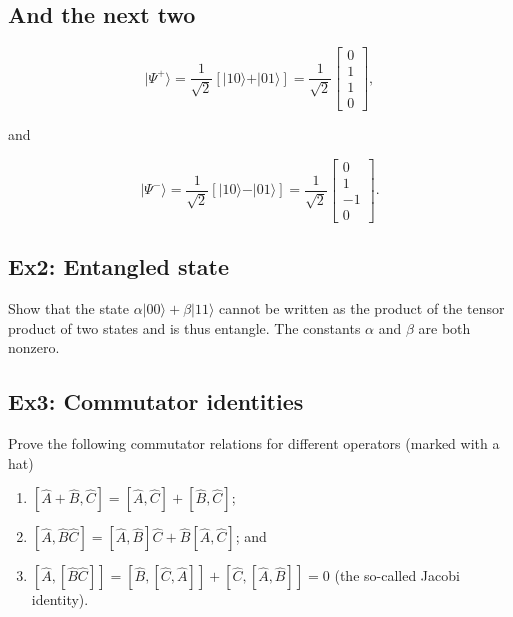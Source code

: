 \subsection{And the next two}
\[
\vert \Psi^+\rangle = \frac{1}{\sqrt{2}}\left[\vert 10\rangle +\vert 01\rangle\right]=\frac{1}{\sqrt{2}}\begin{bmatrix} 0 \\ 1 \\ 1 \\ 0\end{bmatrix},
\]

and

\[
\vert \Psi^-\rangle = \frac{1}{\sqrt{2}}\left[\vert 10\rangle -\vert 01\rangle\right]=\frac{1}{\sqrt{2}}\begin{bmatrix} 0 \\ 1 \\ -1 \\ 0\end{bmatrix}.
\]

\subsection{Ex2: Entangled state}

Show that the state $\alpha \vert 00\rangle+\beta\vert 11\rangle$ cannot be written as the product of the tensor product of two states and is thus entangle. The constants  $\alpha$ and $\beta$ are both nonzero.

\subsection{Ex3: Commutator identities}
Prove the following commutator relations for different operators (marked with a hat)
\begin{enumerate}
\item $[\hat{A}+\hat{B},\hat{C}]= [\hat{A},\hat{C}]+[\hat{B},\hat{C}]$;

\item $[\hat{A},\hat{B}\hat{C}]= [\hat{A},\hat{B}]\hat{C}+\hat{B}[\hat{A},\hat{C}]$; and 

\item $[\hat{A},[\hat{B}\hat{C}]]= [\hat{B},[\hat{C},\hat{A}]]+[\hat{C},[\hat{A},\hat{B}]]=0$ (the so-called Jacobi identity).
\end{enumerate}

\noindent
